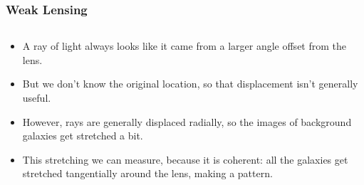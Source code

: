 \documentclass{beamer}
\begin{document}
\frame
{

    \frametitle{Weak Lensing}


    \begin{columns}
        \begin{column}{0.5\textwidth}
            \begin{itemize}

                \item A ray of light always looks like it came from a
                    larger angle offset from the lens.
                    
                \item But we don't know the original location, so that
                    displacement isn't generally useful.

                \item However, rays are generally displaced radially, so the
                    images of background galaxies get stretched a bit.
                    
                \item This stretching we can measure, because it is coherent:  all
                    the galaxies get stretched tangentially around the lens, making
                    a pattern.


\end{itemize}
\end{column}
\end{columns}}
\end{document}
